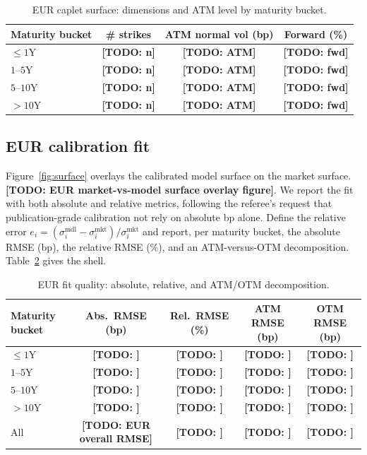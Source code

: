 \documentclass[11pt]{article}
\newcommand{\TODO}[1]{\textbf{[TODO: #1]}}
\newcommand{\Nmkt}{\sigma^{\mathrm{mkt}}}
\newcommand{\Nmdl}{\sigma^{\mathrm{mdl}}}
\theoremstyle{plain}
\theoremstyle{definition}
\begin{document}
\begin{table}[t]
\centering
\caption{EUR caplet surface: dimensions and ATM level by maturity bucket.}
\label{tab:data}
\begin{tabular}{lccc}
\toprule
Maturity bucket & \# strikes & ATM normal vol (bp) & Forward (\%) \\
\midrule
$\le 1$Y   & \TODO{n} & \TODO{ATM} & \TODO{fwd} \\
$1$--$5$Y  & \TODO{n} & \TODO{ATM} & \TODO{fwd} \\
$5$--$10$Y & \TODO{n} & \TODO{ATM} & \TODO{fwd} \\
$>10$Y     & \TODO{n} & \TODO{ATM} & \TODO{fwd} \\
\bottomrule
\end{tabular}
\end{table}

\subsection{EUR calibration fit}

Figure~\ref{fig:surface} overlays the calibrated model surface on the market
surface. \TODO{EUR market-vs-model surface overlay figure}. We report the fit
with both absolute and relative metrics, following the referee's request that
publication-grade calibration not rely on absolute bp alone. Define the relative
error $e_i = (\Nmdl_i - \Nmkt_i)/\Nmkt_i$ and report, per maturity bucket, the
absolute RMSE (bp),
the relative RMSE (\%), and an ATM-versus-OTM decomposition. Table~\ref{tab:fit}
gives the shell.

\begin{table}[t]
\centering
\caption{EUR fit quality: absolute, relative, and ATM/OTM decomposition.}
\label{tab:fit}
\begin{tabular}{lcccc}
\toprule
Maturity bucket & Abs.\ RMSE (bp) & Rel.\ RMSE (\%) & ATM RMSE (bp) & OTM RMSE (bp) \\
\midrule
$\le 1$Y   & \TODO{} & \TODO{} & \TODO{} & \TODO{} \\
$1$--$5$Y  & \TODO{} & \TODO{} & \TODO{} & \TODO{} \\
$5$--$10$Y & \TODO{} & \TODO{} & \TODO{} & \TODO{} \\
$>10$Y     & \TODO{} & \TODO{} & \TODO{} & \TODO{} \\
\midrule
All        & \TODO{EUR overall RMSE} & \TODO{} & \TODO{} & \TODO{} \\
\bottomrule
\end{tabular}
\end{table}
\end{document}

